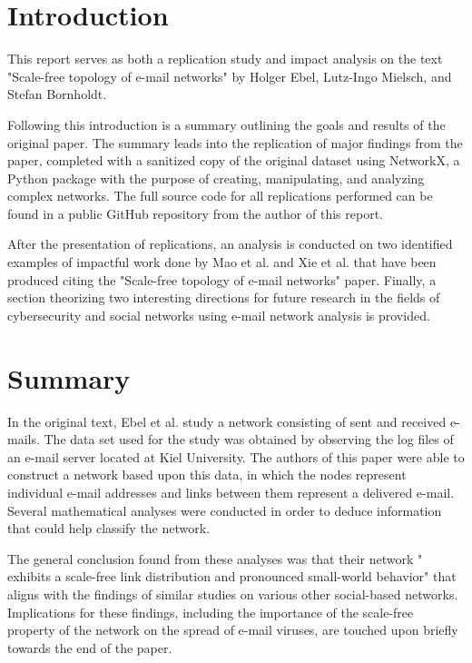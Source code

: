 \documentclass[11pt]{article}
\begin{document}
\begin{multicols}{2}

\section{Introduction}
\hspace*{\parindent}This report serves as both a replication study and impact analysis on the text "Scale-free topology of e-mail networks" \cite{1} by Holger Ebel, Lutz-Ingo Mielsch, and Stefan Bornholdt. 

Following this introduction is a summary outlining the goals and results of the original paper. The summary leads into the replication of major findings from the paper, completed with a sanitized copy of the original dataset using NetworkX, a Python package with the purpose of creating, manipulating, and analyzing complex networks. The full source code for all replications performed can be found in a public GitHub repository \cite{2} from the author of this report. 

After the presentation of replications, an analysis is conducted on two identified examples of impactful work done by Mao et al. \cite{5} and Xie et al. \cite{4} that have been produced citing the "Scale-free topology of e-mail networks" paper. Finally, a section theorizing two interesting directions for future research in the fields of cybersecurity and social networks using e-mail network analysis is provided.

\section{Summary}
\hspace*{\parindent}In the original text, Ebel et al. study a network consisting of sent and received e-mails. The data set used for the study was obtained by observing the log files of an e-mail server located at Kiel University. The authors of this paper were able to construct a network based upon this data, in which the nodes represent individual e-mail addresses and links between them represent a delivered e-mail. Several mathematical analyses were conducted in order to deduce information that could help classify the network. 

The general conclusion found from these analyses was that their network " exhibits a scale-free link distribution and pronounced small-world behavior" \cite{1} that aligns with the findings of similar studies on various other social-based networks. Implications for these findings, including the importance of the scale-free property of the network on the spread of e-mail viruses, are touched upon briefly towards the end of the paper. 


\end{multicols}
\end{document}
